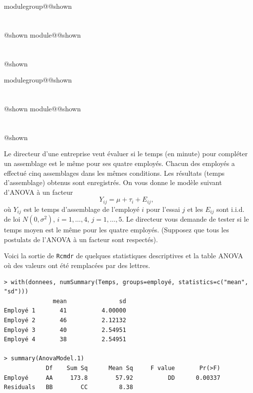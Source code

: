 \documentclass{Evaluation}
\makeatletter
\newcommand{\currentmodulekey}{}
\newcommand{\currentmoduletitle}{}
\newcommand{\currentgroupkey}{}
\newcommand{\currentgrouptitle}{}
\newcommand{\showmoduleifneeded}{%
  \ifx\currentgroupkey\empty\else
    \expandafter\ifx\csname modulegroup@\currentgroupkey @shown\endcsname\relax
      \section*{\currentgrouptitle}%
      \expandafter\gdef\csname modulegroup@\currentgroupkey @shown\endcsname{1}%
    \fi
  \fi
  \expandafter\ifx\csname module@\currentmodulekey @shown\endcsname\relax
    \section*{\currentmoduletitle}%
    \expandafter\gdef\csname module@\currentmodulekey @shown\endcsname{1}%
  \fi
}
\newenvironment{A22}{\showmoduleifneeded}{}
\newenvironment{A23}{\showmoduleifneeded}{}
\makeatother
\begin{document}
\begin{questions}
\begin{A22}
\begin{parts}
\begin{solution}
\end{solution}
\end{parts}
\end{A22}

\begin{A23}
\question {} %
Le directeur d'une entreprise veut évaluer si le temps (en minute) pour compléter un assemblage est le même pour ses quatre employés. Chacun des employés a effectué cinq assemblages dans les mêmes conditions. Les résultats (temps d'assemblage) obtenus sont enregistrés.
On vous donne le modèle suivant d'ANOVA à un facteur
$$Y_{ij}=\mu+\tau_i+E_{ij},$$
où $Y_{ij}$ est le temps d'assemblage de l'employé $i$ pour l'essai $j$ et
les $E_{ij}$ sont i.i.d. de loi $N(0,\sigma^2)$, $i=1,\hdots, 4$,
$j=1,\ldots,5$.
Le directeur vous demande de tester si le temps moyen est le même pour les quatre employés.
(Supposez que tous les postulats de l'ANOVA à un facteur sont respectés).\medskip

Voici la sortie de \texttt{Rcmdr} de quelques statistiques descriptives et la table ANOVA où des valeurs ont été remplacées par des lettres.

\begin{verbatim}
> with(donnees, numSummary(Temps, groups=employé, statistics=c("mean", "sd")))
              mean               sd
Employé 1       41          4.00000
Employé 2       46          2.12132
Employé 3       40          2.54951
Employé 4       38          2.54951

> summary(AnovaModel.1)
            Df    Sum Sq      Mean Sq     F value       Pr(>F)
Employé     AA     173.8        57.92          DD      0.00337
Residuals   BB        CC         8.38
\end{verbatim}

\end{A23}
\end{questions}
\end{document}

